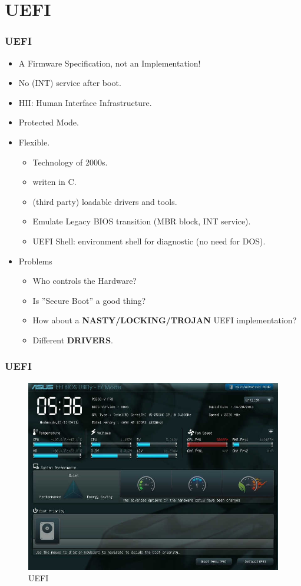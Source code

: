 \documentclass[xcolor=table, notheorems, hyperref={pdfpagelabels=false}]{beamer}
\begin{document}
\section{UEFI}
\begin{frame}
\frametitle{UEFI}
\begin{itemize}
\item A Firmware Specification, not an Implementation!
\item No (INT) service after boot.
\item HII: Human Interface Infrastructure.
\item Protected Mode.
\item Flexible.
\begin{itemize}
\item Technology of 2000s.
\item writen in C.
\item (third party) loadable drivers and tools.
\item Emulate Legacy BIOS transition (MBR block, INT service).
\item UEFI Shell: environment shell for diagnostic (no need for DOS).
\end{itemize}
\item Problems
\begin{itemize}
\item Who controls the Hardware?
\item Is ''Secure Boot'' a good thing?
\item How about a \textbf{NASTY/LOCKING/TROJAN} UEFI implementation?
\item Different \textbf{DRIVERS}.
\end{itemize}
\end{itemize}
\end{frame}


\begin{frame}
\frametitle{UEFI}
\begin{figure}
\includegraphics[width=0.8\linewidth]{os03-UEFI.jpg}
\caption{UEFI}
\end{figure}
\end{frame}
\end{document}
